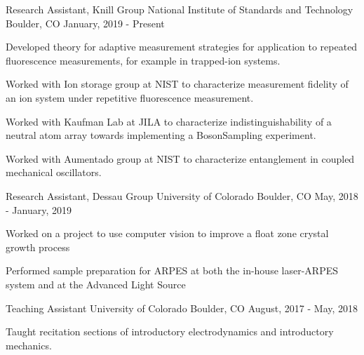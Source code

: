 

\begin{cventries}

  \cventry
    {Research Assistant, Knill Group} %
    {National Institute of Standards and Technology} %
    {Boulder, CO} %
    {January, 2019 - Present} %
    {
      \begin{cvitems} %
        \item {Developed theory for adaptive measurement strategies for
          application to repeated fluorescence measurements, for example in trapped-ion systems.}
        \item {Worked with Ion storage group at NIST to characterize
          measurement fidelity of an ion system under repetitive fluorescence
        measurement.}
        \item {Worked with Kaufman Lab at JILA to characterize
          indistinguishability of a neutral atom array towards implementing a BosonSampling experiment.}
        \item {Worked with Aumentado group at NIST to characterize entanglement
          in coupled mechanical oscillators.}
      \end{cvitems}
    }

  \cventry
    {Research Assistant, Dessau Group} %
    {University of Colorado} %
    {Boulder, CO} %
    {May, 2018 - January, 2019} %
    {
      \begin{cvitems} %
        \item {Worked on a project to use computer vision to improve a float
          zone crystal growth process}
        \item {Performed sample preparation for ARPES at both the in-house laser-ARPES system and at the Advanced Light Source}
      \end{cvitems}
    }

  \cventry
    {Teaching Assistant} %
    {University of Colorado} %
    {Boulder, CO} %
    {August, 2017 - May, 2018} %
    {
      \begin{cvitems} %
        \item {Taught recitation sections of introductory electrodynamics and
          introductory mechanics.}
      \end{cvitems}
    }


\end{cventries}
